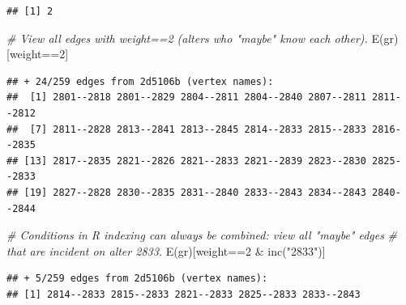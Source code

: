 \documentclass[
]{book}
\newenvironment{Shaded}{\begin{snugshade}}{\end{snugshade}}
\newcommand{\CommentTok}[1]{\textcolor[rgb]{0.56,0.35,0.01}{\textit{#1}}}
\newcommand{\DecValTok}[1]{\textcolor[rgb]{0.00,0.00,0.81}{#1}}
\newcommand{\FunctionTok}[1]{\textcolor[rgb]{0.00,0.00,0.00}{#1}}
\newcommand{\NormalTok}[1]{#1}
\newcommand{\SpecialCharTok}[1]{\textcolor[rgb]{0.00,0.00,0.00}{#1}}
\newcommand{\StringTok}[1]{\textcolor[rgb]{0.31,0.60,0.02}{#1}}
\begin{document}
\begin{verbatim}
## [1] 2
\end{verbatim}

\begin{Shaded}
\begin{Highlighting}[]
\CommentTok{\# View all edges with weight==2 (alters who "maybe" know each other).}
\FunctionTok{E}\NormalTok{(gr)[weight}\SpecialCharTok{==}\DecValTok{2}\NormalTok{] }
\end{Highlighting}
\end{Shaded}

\begin{verbatim}
## + 24/259 edges from 2d5106b (vertex names):
##  [1] 2801--2818 2801--2829 2804--2811 2804--2840 2807--2811 2811--2812
##  [7] 2811--2828 2813--2841 2813--2845 2814--2833 2815--2833 2816--2835
## [13] 2817--2835 2821--2826 2821--2833 2821--2839 2823--2830 2825--2833
## [19] 2827--2828 2830--2835 2831--2840 2833--2843 2834--2843 2840--2844
\end{verbatim}

\begin{Shaded}
\begin{Highlighting}[]
\CommentTok{\# Conditions in R indexing can always be combined: view all "maybe" edges}
\CommentTok{\# that are incident on alter 2833.}
\FunctionTok{E}\NormalTok{(gr)[weight}\SpecialCharTok{==}\DecValTok{2} \SpecialCharTok{\&} \FunctionTok{inc}\NormalTok{(}\StringTok{"2833"}\NormalTok{)]}
\end{Highlighting}
\end{Shaded}

\begin{verbatim}
## + 5/259 edges from 2d5106b (vertex names):
## [1] 2814--2833 2815--2833 2821--2833 2825--2833 2833--2843
\end{verbatim}

\begin{Shaded}
\end{Shaded}
\end{document}
